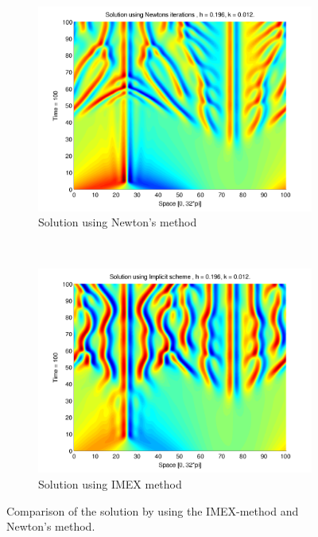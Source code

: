 \begin{figure}[H]
        \centering
        \begin{subfigure}[b]{0.52\textwidth}
                \includegraphics[width=\textwidth]{../PDFs/Comparisons/SolNewton.pdf}
                \caption{Solution using Newton's method}
                \label{fig:solNewton}
        \end{subfigure}%
        ~
        \begin{subfigure}[b]{0.52\textwidth}
                \includegraphics[width=\textwidth]{../PDFs/Comparisons/SolImp.pdf}
                \caption{Solution using IMEX method}
                \label{fig:solImp}
        \end{subfigure}
        \caption{Comparison of the solution by using the IMEX-method and Newton's method.}
        \label{fig:compNewtImpl}
\end{figure}

%
